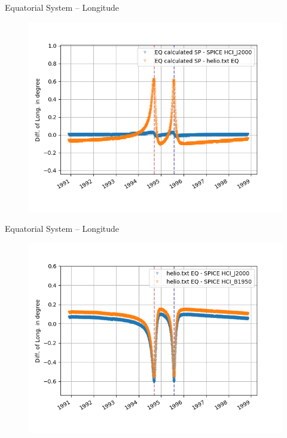 \documentclass{beamer}
\begin{document}
\begin{frame}{Equatorial System -- Longitude}
\begin{figure}									
	\includegraphics[width=1\textwidth]{Pics/EQ_LONG_CALC.png}
\end{figure}
\end{frame}

\begin{frame}{Equatorial System -- Longitude}
\begin{figure}									
	\includegraphics[width=1\textwidth]{Pics/EQ_LONG_J_B.png}
\end{figure}
\end{frame}
\end{document}
